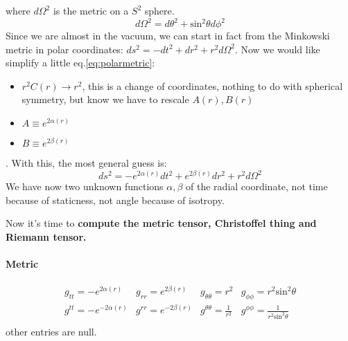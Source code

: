 where $d\Omega ^{2}$ is the metric on a $S^{2}$ sphere.
\[
	d\Omega ^{2} = d\theta ^{2} + \text{sin}^{2}\theta d\phi ^{2}
\]
Since we are almost in the vacuum, we can start in fact from the Minkowski metric in polar coordinates: $ds^{2 }=-dt^{2} +dr^{2}+r^{2}d\Omega ^{2} $.
Now we would like simplify a little eq.\ref{eq:polarmetric}:
\begin{itemize}
\item $r^{2}C\left( r \right) \to  r^{2}$, this is a change of coordinates, nothing to do with spherical symmetry, but know we have to rescale $A\left( r \right), B\left( r \right)$
\item $A \equiv e^{2\alpha \left( r \right)}$
\item $B\equiv e^{2\beta \left( r \right)}$
\end{itemize}.
With this, the most general guess is:
\begin{equation}\label{eq:pmetric2}
ds^{2} = -e^{2\alpha \left( r \right)}dt^{2} + e^{2\beta \left( r \right)}dr^{2} + r^{2}d\Omega ^{2}
\end{equation}
We have now two unknown functions $\alpha ,\beta $ of the radial coordinate, not time because of staticness, not angle because of isotropy.\par
Now it's time to \textbf{compute the metric tensor, Christoffel thing and Riemann tensor.}\par
\paragraph{Metric} 
\begin{equation}
\begin{matrix} 
	g_{tt}= -e^{2\alpha \left( r \right)} & g_{rr}=e^{2\beta \left( r \right)} & g_{\theta \theta }= r^{2} & g_{\phi \phi } = r^{2}\text{sin}^{2}\theta  \\
	g^{tt}=-e^{-2\alpha \left( r \right)} & g^{rr}=e^{-2\beta \left( r \right)} & g^{\theta \theta }= \frac{1}{r^{2}} & g^{\phi \phi }=\frac{1}{r^{2}\text{sin}^{2}\theta } \\
\end{matrix}
\end{equation}
other entries are null.
